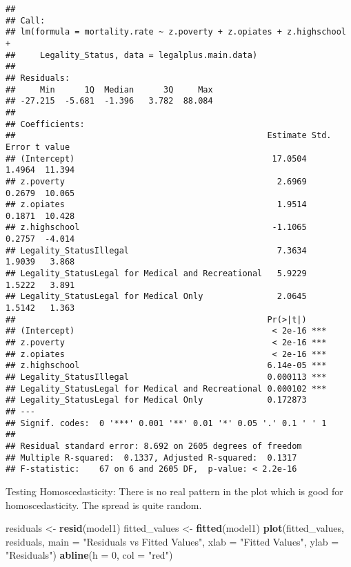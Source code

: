 \documentclass[
]{article}
\newenvironment{Shaded}{\begin{snugshade}}{\end{snugshade}}
\newcommand{\AttributeTok}[1]{\textcolor[rgb]{0.13,0.29,0.53}{#1}}
\newcommand{\DecValTok}[1]{\textcolor[rgb]{0.00,0.00,0.81}{#1}}
\newcommand{\FunctionTok}[1]{\textcolor[rgb]{0.13,0.29,0.53}{\textbf{#1}}}
\newcommand{\NormalTok}[1]{#1}
\newcommand{\OtherTok}[1]{\textcolor[rgb]{0.56,0.35,0.01}{#1}}
\newcommand{\StringTok}[1]{\textcolor[rgb]{0.31,0.60,0.02}{#1}}
\begin{document}
\begin{verbatim}
## 
## Call:
## lm(formula = mortality.rate ~ z.poverty + z.opiates + z.highschool + 
##     Legality_Status, data = legalplus.main.data)
## 
## Residuals:
##     Min      1Q  Median      3Q     Max 
## -27.215  -5.681  -1.396   3.782  88.084 
## 
## Coefficients:
##                                                   Estimate Std. Error t value
## (Intercept)                                        17.0504     1.4964  11.394
## z.poverty                                           2.6969     0.2679  10.065
## z.opiates                                           1.9514     0.1871  10.428
## z.highschool                                       -1.1065     0.2757  -4.014
## Legality_StatusIllegal                              7.3634     1.9039   3.868
## Legality_StatusLegal for Medical and Recreational   5.9229     1.5222   3.891
## Legality_StatusLegal for Medical Only               2.0645     1.5142   1.363
##                                                   Pr(>|t|)    
## (Intercept)                                        < 2e-16 ***
## z.poverty                                          < 2e-16 ***
## z.opiates                                          < 2e-16 ***
## z.highschool                                      6.14e-05 ***
## Legality_StatusIllegal                            0.000113 ***
## Legality_StatusLegal for Medical and Recreational 0.000102 ***
## Legality_StatusLegal for Medical Only             0.172873    
## ---
## Signif. codes:  0 '***' 0.001 '**' 0.01 '*' 0.05 '.' 0.1 ' ' 1
## 
## Residual standard error: 8.692 on 2605 degrees of freedom
## Multiple R-squared:  0.1337, Adjusted R-squared:  0.1317 
## F-statistic:    67 on 6 and 2605 DF,  p-value: < 2.2e-16
\end{verbatim}

Testing Homoscedasticity: There is no real pattern in the plot which is
good for homoscedasticity. The spread is quite random.

\begin{Shaded}
\begin{Highlighting}[]
\NormalTok{residuals }\OtherTok{\textless{}{-}} \FunctionTok{resid}\NormalTok{(model1)}
\NormalTok{fitted\_values }\OtherTok{\textless{}{-}} \FunctionTok{fitted}\NormalTok{(model1)}
\FunctionTok{plot}\NormalTok{(fitted\_values, residuals, }\AttributeTok{main =} \StringTok{"Residuals vs Fitted Values"}\NormalTok{, }
     \AttributeTok{xlab =} \StringTok{"Fitted Values"}\NormalTok{, }\AttributeTok{ylab =} \StringTok{"Residuals"}\NormalTok{)}
\FunctionTok{abline}\NormalTok{(}\AttributeTok{h =} \DecValTok{0}\NormalTok{, }\AttributeTok{col =} \StringTok{"red"}\NormalTok{)  }
\end{Highlighting}
\end{Shaded}
\end{document}
